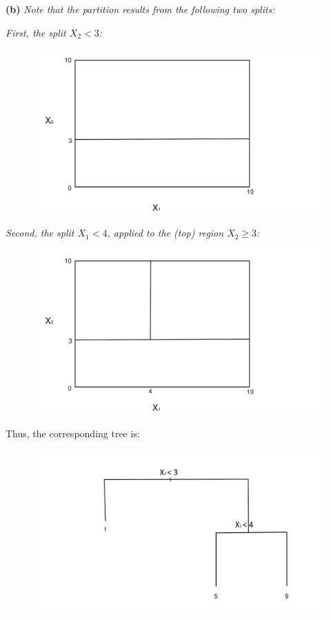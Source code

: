 \documentclass[12pt, answers]{exam}
\begin{document}
\clearpage

\textbf{(b)} \textit{Note that the partition results from the following two splits:}

\textit{First, the split $X_2<3$:}
\begin{figure}[!h]
\includegraphics[scale=0.22]{P2b.pdf}
\end{figure}

\textit{Second, the split $X_1<4$, applied to the (top) region $X_2\ge 3$:}
\begin{figure}[!h]
\includegraphics[scale=0.22]{P2c.pdf}
\end{figure}

Thus, the corresponding tree is:
\begin{figure}[!h]
\includegraphics[scale=0.35]{T2.pdf}
\end{figure}
\end{document}
